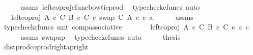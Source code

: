 \begin{isabellebody}
\ \ \ \ \isamarkupfalse%
\ assms\ left{\isacharunderscore}{\kern0pt}coproj{\isacharunderscore}{\kern0pt}cfunc{\isacharunderscore}{\kern0pt}bowtie{\isacharunderscore}{\kern0pt}prod\ \isamarkupfalse%
\ {\isacharparenleft}{\kern0pt}typecheck{\isacharunderscore}{\kern0pt}cfuncs{\isacharcomma}{\kern0pt}\ auto{\isacharparenright}{\kern0pt}\isanewline
\ \ \isamarkupfalse%
\ \isamarkupfalse%
\ {\isachardoublequoteopen}{\isachardot}{\kern0pt}{\isachardot}{\kern0pt}{\isachardot}{\kern0pt}\ {\isacharequal}{\kern0pt}\ left{\isacharunderscore}{\kern0pt}coproj\ {\isacharparenleft}{\kern0pt}A\ {\isasymtimes}\isactrlsub c\ C{\isacharparenright}{\kern0pt}\ {\isacharparenleft}{\kern0pt}B\ {\isasymtimes}\isactrlsub c\ C{\isacharparenright}{\kern0pt}\ {\isasymcirc}\isactrlsub c\ swap\ C\ A\ {\isasymcirc}\isactrlsub c\ {\isasymlangle}c{\isacharcomma}{\kern0pt}\ a{\isasymrangle}{\isachardoublequoteclose}\isanewline
\ \ \ \ \isamarkupfalse%
\ assms\ \isamarkupfalse%
\ {\isacharparenleft}{\kern0pt}typecheck{\isacharunderscore}{\kern0pt}cfuncs{\isacharcomma}{\kern0pt}\ smt\ comp{\isacharunderscore}{\kern0pt}associative{}{\isacharparenright}{\kern0pt}\isanewline
\ \ \isamarkupfalse%
\ \isamarkupfalse%
\ {\isachardoublequoteopen}{\isachardot}{\kern0pt}{\isachardot}{\kern0pt}{\isachardot}{\kern0pt}\ {\isacharequal}{\kern0pt}\ left{\isacharunderscore}{\kern0pt}coproj\ {\isacharparenleft}{\kern0pt}A\ {\isasymtimes}\isactrlsub c\ C{\isacharparenright}{\kern0pt}\ {\isacharparenleft}{\kern0pt}B\ {\isasymtimes}\isactrlsub c\ C{\isacharparenright}{\kern0pt}\ {\isasymcirc}\isactrlsub c\ {\isasymlangle}a{\isacharcomma}{\kern0pt}\ c{\isasymrangle}{\isachardoublequoteclose}\isanewline
\ \ \ \ \isamarkupfalse%
\ assms\ swap{\isacharunderscore}{\kern0pt}ap\ \isamarkupfalse%
\ {\isacharparenleft}{\kern0pt}typecheck{\isacharunderscore}{\kern0pt}cfuncs{\isacharcomma}{\kern0pt}\ auto{\isacharparenright}{\kern0pt}\isanewline
\ \ \isamarkupfalse%
\ \isamarkupfalse%
\ {\isacharquery}{\kern0pt}thesis\isacommand{{\isachardot}{\kern0pt}}\isamarkupfalse%
\isanewline
{}\isamarkupfalse%
%
\endisatagproof
{\isafoldproof}%
%
\isadelimproof
\isanewline
%
\endisadelimproof
\isanewline
{}\isamarkupfalse%
\ dist{\isacharunderscore}{\kern0pt}prod{\isacharunderscore}{\kern0pt}coprod{\isacharunderscore}{\kern0pt}right{\isacharunderscore}{\kern0pt}ap{\isacharunderscore}{\kern0pt}right{\isacharcolon}{\kern0pt}\isanewline

\end{isabellebody}
